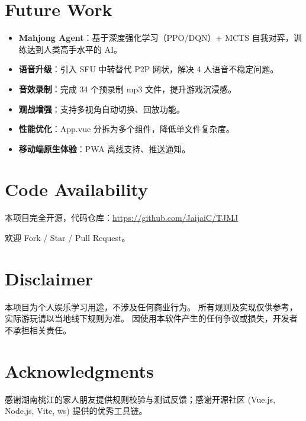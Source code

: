 \documentclass[11pt,a4paper]{article}
\begin{document}
\section*{Future Work}

\begin{itemize}[nosep]
  \item \textbf{Mahjong Agent}：基于深度强化学习（PPO/DQN）+ MCTS 自我对弈，训练达到人类高手水平的 AI。
  \item \textbf{语音升级}：引入 SFU 中转替代 P2P 网状，解决 4 人语音不稳定问题。
  \item \textbf{音效录制}：完成 34 个预录制 mp3 文件，提升游戏沉浸感。
  \item \textbf{观战增强}：支持多视角自动切换、回放功能。
  \item \textbf{性能优化}：App.vue 分拆为多个组件，降低单文件复杂度。
  \item \textbf{移动端原生体验}：PWA 离线支持、推送通知。
\end{itemize}

\section*{Code Availability}

本项目完全开源，代码仓库：\url{https://github.com/JaijaiC/TJMJ}

欢迎 Fork / Star / Pull Request。

\section*{Disclaimer}

本项目为个人娱乐学习用途，不涉及任何商业行为。
所有规则及实现仅供参考，实际游玩请以当地线下规则为准。
因使用本软件产生的任何争议或损失，开发者不承担相关责任。

\section*{Acknowledgments}

感谢湖南桃江的家人朋友提供规则校验与测试反馈；感谢开源社区
(Vue.js, Node.js, Vite, ws) 提供的优秀工具链。
\end{document}
